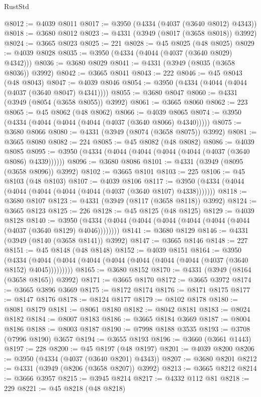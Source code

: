 \begin{lexlean}{RustStd}
\begin{coremodule}
@8012 := @4039 @8011
@8017 := @3950 (@4334 (@4037 (@3640 @8012) @4343))
@8018 := @3680 @8012
@8023 := @4331 (@3949 (@8017 (@3658 @8018)) @3992)
@8024 := @3665 @8023
@8025 := 221
@8028 := @45 @8025 (@48 @8025)
@8029 := @4039 @8028
@8035 := @3950 (@4334 (@4044 (@4037 (@3640 @8029) @4342)))
@8036 := @3680 @8029
@8041 := @4331 (@3949 (@8035 (@3658 @8036)) @3992)
@8042 := @3665 @8041
@8043 := 222
@8046 := @45 @8043 (@48 @8043)
@8047 := @4039 @8046
@8054 := @3950 (@4334 (@4044 (@4044 (@4037 (@3640 @8047) @4341))))
@8055 := @3680 @8047
@8060 := @4331 (@3949 (@8054 (@3658 @8055)) @3992)
@8061 := @3665 @8060
@8062 := 223
@8065 := @45 @8062 (@48 @8062)
@8066 := @4039 @8065
@8074 := @3950 (@4334 (@4044 (@4044 (@4044 (@4037 (@3640 @8066) @4340)))))
@8075 := @3680 @8066
@8080 := @4331 (@3949 (@8074 (@3658 @8075)) @3992)
@8081 := @3665 @8080
@8082 := 224
@8085 := @45 @8082 (@48 @8082)
@8086 := @4039 @8085
@8095 := @3950 (@4334 (@4044 (@4044 (@4044 (@4044 (@4037 (@3640 @8086) @4339))))))
@8096 := @3680 @8086
@8101 := @4331 (@3949 (@8095 (@3658 @8096)) @3992)
@8102 := @3665 @8101
@8103 := 225
@8106 := @45 @8103 (@48 @8103)
@8107 := @4039 @8106
@8117 := @3950 (@4334 (@4044 (@4044 (@4044 (@4044 (@4044 (@4037 (@3640 @8107) @4338)))))))
@8118 := @3680 @8107
@8123 := @4331 (@3949 (@8117 (@3658 @8118)) @3992)
@8124 := @3665 @8123
@8125 := 226
@8128 := @45 @8125 (@48 @8125)
@8129 := @4039 @8128
@8140 := @3950 (@4334 (@4044 (@4044 (@4044 (@4044 (@4044 (@4044 (@4037 (@3640 @8129) @4046))))))))
@8141 := @3680 @8129
@8146 := @4331 (@3949 (@8140 (@3658 @8141)) @3992)
@8147 := @3665 @8146
@8148 := 227
@8151 := @45 @8148 (@48 @8148)
@8152 := @4039 @8151
@8164 := @3950
    (@4334 (@4044 (@4044 (@4044 (@4044 (@4044 (@4044 (@4044 (@4037 (@3640 @8152) @4045)))))))))
@8165 := @3680 @8152
@8170 := @4331 (@3949 (@8164 (@3658 @8165)) @3992)
@8171 := @3665 @8170
@8172 := @3665 @3972
@8174 := @3665 @3896 @3669
@8175 := @8172 @8174
@8176 := @8171 @8175
@8177 := @8147 @8176
@8178 := @8124 @8177
@8179 := @8102 @8178
@8180 := @8081 @8179
@8181 := @8061 @8180
@8182 := @8042 @8181
@8183 := @8024 @8182
@8184 := @8007 @8183
@8186 := @3665 @8184 @3669
@8187 := @8004 @8186
@8188 := @8003 @8187
@8190 := @7998 @8188 @3535
@8193 := @3708 (@7996 @8190) @3657
@8194 := @3655 @8193
@8196 := @3660 (@3661 @1443)
@8197 := 228
@8200 := @45 @8197 (@48 @8197)
@8201 := @4039 @8200
@8206 := @3950 (@4334 (@4037 (@3640 @8201) @4343))
@8207 := @3680 @8201
@8212 := @4331 (@3949 (@8206 (@3658 @8207)) @3992)
@8213 := @3665 @8212
@8214 := @3666 @3957
@8215 := @3945 @8214
@8217 := @4332 @112 @81
@8218 := 229
@8221 := @45 @8218 (@48 @8218)

\end{coremodule}
\end{lexlean}
